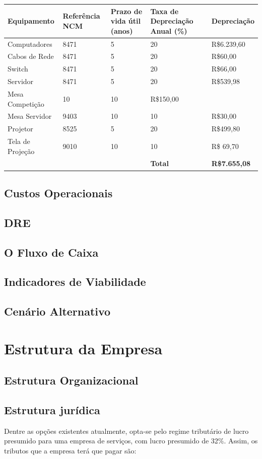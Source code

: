 \documentclass[a4paper, 12pt]{paper}
\begin{document}
\begin{table}[ht]
	\centering
	\begin{tabular}{p{3.5cm}p{2cm}p{3cm}p{3.5cm}p{2.5cm}}
		\hline
		\cellcolor{gray}Equipamento&\cellcolor{gray}Referência NCM&\cellcolor{gray}Prazo de vida útil (anos)&\cellcolor{gray}Taxa de Depreciação Anual (\%)&\cellcolor{gray}Depreciação \\
		\hline
		Computadores&8471&5&20&R\$6.239,60\\
		Cabos de Rede&8471&5&20&R\$60,00\\
		Switch&8471&5&20&R\$66,00\\
		Servidor&8471&5&20&R\$539,98\\
		Mesa Competição&10&10&R\$150,00\\
		Mesa Servidor&9403&10&10&R\$30,00\\		
		Projetor&8525&5&20&R\$499,80\\		
		Tela de Projeção&9010&10&10&R\$ 69,70\\				
		\hline
		&&&\textbf{Total}&\textbf{R\$7.655,08}\\
		\hline
	\end{tabular}
\end{table}
\subsection{Custos Operacionais}
\subsection{DRE}
\subsection{O Fluxo de Caixa}
\subsection{Indicadores de Viabilidade}
\subsection{Cenário Alternativo}
\newpage
\section{Estrutura da Empresa}
\subsection{Estrutura Organizacional}
\subsection{Estrutura jurídica}
Dentre as opções existentes atualmente, opta-se pelo regime tributário de lucro presumido para uma empresa de serviços, com lucro presumido de 32\%. Assim, os tributos que a empresa terá que pagar são:
\end{document}
